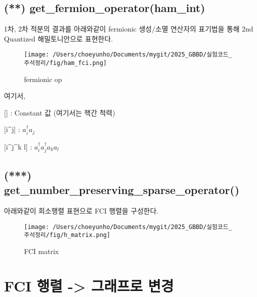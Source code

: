 \documentclass[11pt]{article}
\begin{document}
\subsection{(**) get\_fermion\_operator(ham\_int)}
1차, 2차 적분의 결과를 아래와같이 fermionic 생성/소멸 연산자의 표기법을 통해 2nd Quantized 해밀토니안으로 표현한다. 
\begin{figure}[H]
    \centering
    \texttt{[image: /Users/choeyunho/Documents/mygit/2025\_GBBD/실험코드\_주석정리/fig/ham\_fci.png]}
    \caption{fermionic op}
    \label{fig:my_image}
\end{figure}
여기서, 
\begin{center}
[] : Constant 값 (여기서는 핵간 척력) 

[i\textasciicircum  j] : $a^{\dagger}_i a_j $ 

[i\textasciicircum  j\textasciicircum k l] : $a^{\dagger}_i a^{\dagger}_j a_k a_l $ 
\end{center}

\newpage

\subsection{(***) get\_number\_preserving\_sparse\_operator()}
아래와같이 희소행렬 표현으로 FCI 행렬을 구성한다. 
\begin{figure}[H]
    \centering
    \texttt{[image: /Users/choeyunho/Documents/mygit/2025\_GBBD/실험코드\_주석정리/fig/h\_matrix.png]}
    \caption{FCI matrix}
    \label{fig:my_image}
\end{figure}

\newpage

\section{FCI 행렬 -> 그래프로 변경}
\end{document}
